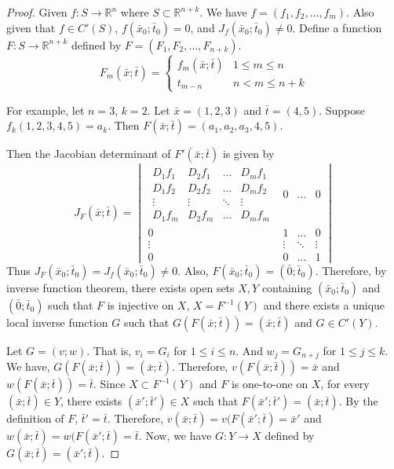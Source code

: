 \begin{proof}
	Given $f : S \to \mathbb{R}^n$ where $S \subset \mathbb{R}^{n+k}$.
	We have $f = (f_1,f_2,\dots,f_m)$.
	Also given that $f \in C'(S)$, $f(\bar{x}_0;\bar{t}_0) = 0$, and $J_f(\bar{x}_0;\bar{t}_0) \ne 0$.
	Define a function $F : S \to \mathbb{R}^{n+k}$ defined by $F = (F_1,F_2,\dots,F_{n+k})$.
	\[ F_m(\bar{x};\bar{t}) = \begin{cases}
		f_m(\bar{x};\bar{t}) & 1 \le m \le n\\
		t_{m-n} & n < m \le n+k
	\end{cases} \]
	\begin{commentary}
		For example, let $n = 3$, $k = 2$.
		Let $\bar{x} = (1,2,3)$ and $\bar{t} = (4,5)$.
		Suppose $f_k(1,2,3,4,5) = a_k$.
		Then $F(\bar{x};\bar{t}) = (a_1,a_2,a_3,4,5)$.
	\end{commentary}

	Then the Jacobian determinant of $F'(\bar{x};\bar{t})$ is given by
	\[ J_F(\bar{x};\bar{t}) = \begin{vmatrix}
		\begin{matrix}
			D_1f_1 & D_2f_1 & \dots & D_mf_1 \\
			D_1f_2 & D_2f_2 & \dots & D_mf_2 \\
			\vdots & \vdots & \ddots & \vdots \\
			D_1f_m & D_2f_m & \dots & D_mf_m
		\end{matrix}
		& 0 & \dots & 0 \\
		0 & 1 & \dots & 0 \\
		\vdots & \vdots & \ddots & \vdots \\
		0 & 0 & \dots & 1 
	\end{vmatrix} \]
	Thus $J_F(\bar{x}_0;\bar{t}_0) = J_f(\bar{x}_0;\bar{t}_0) \ne 0$.
	Also, $F(\bar{x}_0;\bar{t}_0) = (\bar{0};\bar{t}_0)$.
	Therefore, by inverse function theorem, there exists open sets $X,Y$ containing $(\bar{x}_0;\bar{t}_0)$ and $(\bar{0};\bar{t}_0)$ such that $F$ is injective on $X$, $X = F^{-1}(Y)$ and there exists a unique local inverse function $G$ such that $G(F(\bar{x};\bar{t})) = (\bar{x};\bar{t})$ and $G \in C'(Y)$.

	Let $G = (v;w)$.
	That is, $v_i = G_i$ for $1 \le i \le n$.
	And $w_j = G_{n+j}$ for $1 \le j \le k$.
	We have, $G(F(\bar{x};\bar{t})) = (\bar{x};\bar{t})$.
	Therefore, $v(F(\bar{x};\bar{t})) = \bar{x}$ and $w(F(\bar{x};\bar{t})) = \bar{t}$.
	Since $X \subset F^{-1}(Y)$ and $F$ is one-to-one on $X$, for every $(\bar{x};\bar{t}) \in Y$, there exists $(\bar{x}';\bar{t}') \in X$ such that $F(\bar{x}';\bar{t}') = (\bar{x};\bar{t})$.
	By the definition of $F$, $\bar{t}' = \bar{t}$.
	Therefore, $v(\bar{x};\bar{t}) = v(F(\bar{x}';\bar{t}) = \bar{x}'$ and $w(\bar{x};\bar{t}) = w(F(\bar{x}';\bar{t}) = \bar{t}$.
	Now, we have $G : Y \to X$ defined by $G(\bar{x};\bar{t}) = (\bar{x}';\bar{t})$.


\end{proof}
